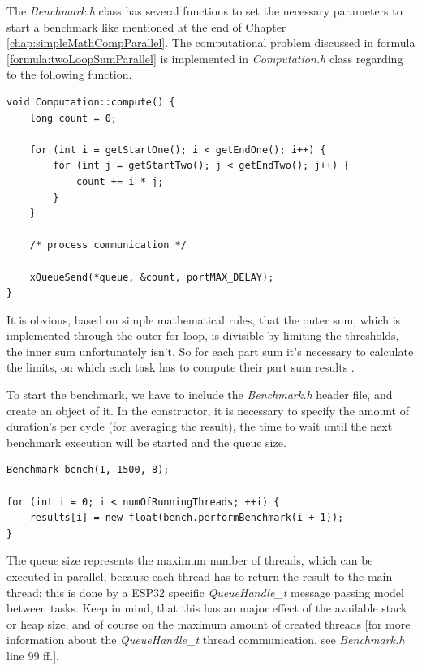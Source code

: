 The \textit{Benchmark.h} class has several functions to set the necessary parameters to start a benchmark like mentioned at the end of Chapter \ref{chap:simpleMathCompParallel}. The computational problem discussed in formula \ref{formula:twoLoopSumParallel} is implemented in \textit{Computation.h} class regarding to the following function.

\begin{lstlisting}
void Computation::compute() {
	long count = 0;
	
	for (int i = getStartOne(); i < getEndOne(); i++) {
		for (int j = getStartTwo(); j < getEndTwo(); j++) {
			count += i * j;
		}
	}
	
	/* process communication */
	
	xQueueSend(*queue, &count, portMAX_DELAY);
}
\end{lstlisting}

It is obvious, based on simple mathematical rules, that the outer sum, which is implemented through the outer for-loop, is divisible by limiting the thresholds, the inner sum unfortunately isn't. So for each part sum it's necessary to calculate the limits, on which each task has to compute their part sum results \parencite[see][Benchmark.h, line 94 ff.]{internet12}.

\newpage

\noindent To start the benchmark, we have to include the \textit{Benchmark.h} header file, and create an object of it. In the constructor, it is necessary to specify the amount of duration's per cycle (for averaging the result), the time to wait until the next benchmark execution will be started and the queue size.

\begin{lstlisting}
Benchmark bench(1, 1500, 8);

for (int i = 0; i < numOfRunningThreads; ++i) {
	results[i] = new float(bench.performBenchmark(i + 1));
}
\end{lstlisting}

The queue size represents the maximum number of threads, which can be executed in parallel, because each thread has to return the result to the main thread; this is done by a ESP32 specific \textit{QueueHandle\_t} message passing model between tasks. Keep in mind, that this has an major effect of the available stack or heap size, and of course on the maximum amount of created threads [for more information about the \textit{QueueHandle\_t} thread communication, see \textit{Benchmark.h} line 99 ff.].\\

